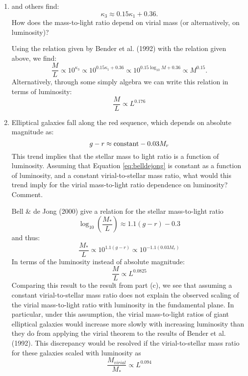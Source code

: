 \begin{enumerate}
\begin{enumerate}
\item \cite{bender92a} and others find:
\begin{equation}
\kappa_3 \approx 0.15 \kappa_1 + 0.36.
\end{equation}
How does the mass-to-light ratio depend on virial mass (or
alternatively, on luminosity)?

\begin{answer}
Using the relation given by Bender et al. (1992) with the relation
given above, we find:
\begin{equation}
\frac{M}{L} \propto 10^{\kappa_3} \propto 10^{0.15\kappa_1 +
0.36}  \propto 10^{0.15 \log_{10}M + 0.36} \propto M^{0.15}.
\end{equation}
Alternatively, through some simply algebra we can write this relation
in terms of luminosity:
\begin{equation}
\frac{M}{L} \propto L^{0.176}
\end{equation}
\end{answer}

\item Elliptical galaxies fall along the red sequence, which depends
on absolute magnitude as:
\begin{equation}
g-r \approx {\rm constant} - 0.03 M_r
\end{equation}
This trend implies that the stellar mass to light ratio is a function
of luminosity. Assuming that Equation \ref{eq:belldejong} is constant as a
function of luminosity, and a constant virial-to-stellar mass ratio,
what would this trend imply for the virial mass-to-light ratio
dependence on luminosity? Comment.

\begin{answer}
Bell \& de Jong (2000) give a relation for the stellar mass-to-light ratio
\begin{equation}
\log_{10}(\frac{M_\ast}{L}) \approx 1.1(g-r) - 0.3
\end{equation}
and thus:
\begin{equation}
\frac{M_\ast}{L} \propto 10^{1.1(g-r)} \propto 10^{-1.1(0.03M_r)}
\end{equation}
In terms of the luminosity instead of absolute magnitude:
\begin{equation}
\frac{M}{L} \propto L^{0.0825}
\end{equation}
Comparing this result to the result from part (c), we see that
assuming a constant virial-to-stellar mass ratio does not explain the
observed scaling of the virial mass-to-light ratio with luminosity in
the fundamental plane. In particular, under this assumption, the
virial mass-to-light ratios of giant elliptical galaxies would
increase more slowly with increasing luminosity than they do from
applying the virial theorem to the results of Bender et
al. (1992). This discrepancy would be resolved if the
virial-to-stellar mass ratio for these galaxies scaled with luminosity
as
\begin{equation}
\frac{M_{virial}}{M_{\ast}} \propto L^{0.094}
\end{equation}
\end{answer}


\end{enumerate}
\end{enumerate}
